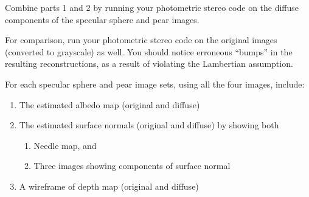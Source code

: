 \documentclass[11pt]{article}
\providecommand{\tightlist}{%
      \setlength{\itemsep}{0pt}\setlength{\parskip}{0pt}}
\begin{document}
Combine parts 1 and 2 by running your photometric stereo code on the
diffuse components of the specular sphere and pear images.

For comparison, run your photometric stereo code on the original images
(converted to grayscale) as well. You should notice erroneous ``bumps''
in the resulting reconstructions, as a result of violating the
Lambertian assumption.

For each specular sphere and pear image sets, using all the four images,
include:

\begin{enumerate}
\def\labelenumi{\arabic{enumi}.}
\item
  The estimated albedo map (original and diffuse)
\item
  The estimated surface normals (original and diffuse) by showing both

  \begin{enumerate}
  \def\labelenumii{\arabic{enumii}.}
  \tightlist
  \item
    Needle map, and
  \item
    Three images showing components of surface normal
  \end{enumerate}
\item
  A wireframe of depth map (original and diffuse)
\end{enumerate}
\end{document}
